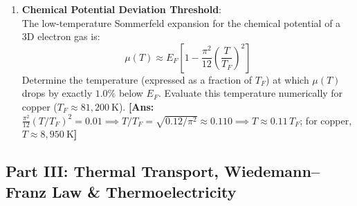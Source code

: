 \documentclass[11pt,a4paper]{article}
\begin{document}
\begin{enumerate}[label=\textbf{\arabic*.}, resume, leftmargin=*]
    \item \textbf{Chemical Potential Deviation Threshold}:\\
    The low-temperature Sommerfeld expansion for the chemical potential of a 3D electron gas is:
    \[
    \mu(T) \approx E_F \left[ 1 - \frac{\pi^2}{12}\left(\frac{T}{T_F}\right)^2 \right]
    \]
    Determine the temperature (expressed as a fraction of $T_F$) at which $\mu(T)$ drops by exactly $1.0\%$ below $E_F$. Evaluate this temperature numerically for copper ($T_F \approx 81{,}200\ \mathrm{K}$).
    \textbf{[Ans:} $\frac{\pi^2}{12}(T/T_F)^2 = 0.01 \implies T/T_F = \sqrt{0.12/\pi^2} \approx 0.110 \implies T \approx 0.11\, T_F$; for copper, $T \approx 8{,}950\ \mathrm{K}$\textbf{]}
\end{enumerate}

\vspace{0.4cm}

\subsection*{Part III: Thermal Transport, Wiedemann--Franz Law \& Thermoelectricity}
\end{document}
